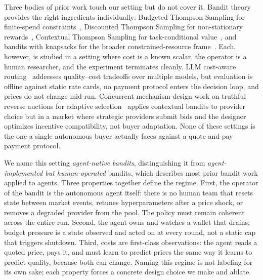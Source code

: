 Three bodies of prior work touch our setting but do not cover it. Bandit theory provides the right ingredients individually: Budgeted Thompson Sampling for finite-spend constraints~\citep{xia2015bts}, Discounted Thompson Sampling for non-stationary rewards~\citep{qi2023dsts}, Contextual Thompson Sampling for task-conditional value~\citep{agrawal2013contextualts}, and bandits with knapsacks for the broader constrained-resource frame~\citep{badanidiyuru2018bandits}. Each, however, is studied in a setting where cost is a known scalar, the operator is a human researcher, and the experiment terminates cleanly. LLM cost-aware routing~\citep{chen2023frugalgpt,ong2024routellm,ding2024hybridllm,mixllm2024,madaan2024automix,llmbandit2025} addresses quality--cost tradeoffs over multiple models, but evaluation is offline against static rate cards, no payment protocol enters the decision loop, and prices do not change mid-run. Concurrent mechanism-design work on truthful reverse auctions for adaptive selection~\citep{aamas2026reverseauction} applies contextual bandits to provider choice but in a market where strategic providers submit bids and the designer optimizes incentive compatibility, not buyer adaptation. None of these settings is the one a single autonomous buyer actually faces against a quote-and-pay payment protocol.

We name this setting \emph{agent-native bandits}, distinguishing it from \emph{agent-implemented but human-operated} bandits, which describes most prior bandit work applied to agents. Three properties together define the regime. First, the operator of the bandit is the autonomous agent itself: there is no human team that resets state between market events, retunes hyperparameters after a price shock, or removes a degraded provider from the pool. The policy must remain coherent across the entire run. Second, the agent owns and watches a wallet that drains; budget pressure is a state observed and acted on at every round, not a static cap that triggers shutdown. Third, costs are first-class observations: the agent reads a quoted price, pays it, and must learn to predict prices the same way it learns to predict quality, because both can change. Naming this regime is not labeling for its own sake; each property forces a concrete design choice we make and ablate.


